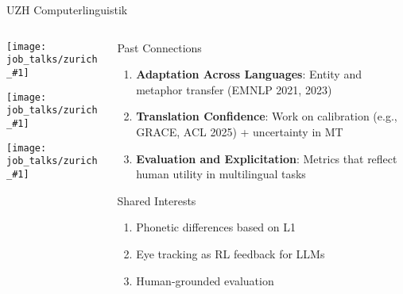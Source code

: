 \documentclass[compress]{beamer}
\newcommand{\gfxz}[2]{
	\begin{center}
		\texttt{[image: job\_talks/zurich\_\#1]}
	\end{center}
}
\begin{document}
\begin{frame}{UZH Computerlinguistik}
\begin{columns}
  \begin{column}{0.1\textwidth}
    \gfxz{rico}{1}
    \gfxz{lena}{1}
    \gfxz{eleanor}{1}
  \end{column}
  \begin{column}{0.8\textwidth}
    \begin{block}{Past Connections}
      \begin{enumerate}
        \item \textbf{Adaptation Across Languages}:  
        Entity and metaphor transfer (EMNLP 2021, 2023)

        \item \textbf{Translation Confidence}:  
        Work on calibration (e.g., GRACE, ACL 2025) + uncertainty in MT

        \item \textbf{Evaluation and Explicitation}:  
        Metrics that reflect human utility in multilingual tasks
      \end{enumerate}
    \end{block}

    \begin{block}{Shared Interests}
      \begin{enumerate}
        \item Phonetic differences based on L1
        \item Eye tracking as RL feedback for LLMs 
        \item Human-grounded evaluation
      \end{enumerate}
    \end{block}
  \end{column}
\end{columns}
\end{frame}
\end{document}
